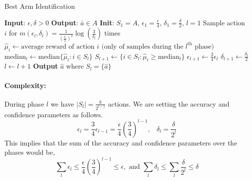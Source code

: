 










\begin{algorithm}
\caption{Best Arm Identification}
\begin{algorithmic}[1]
\State \textbf{Input}: $\epsilon, \delta > 0$
\State \textbf{Output}: $\bar{a} \in A$
\State \textbf{Init}: $S_{1} = A$, $\epsilon_{1} = \frac{\epsilon}{4}$, $\delta_{1} = \frac{\delta}{2}$, $l = 1$
\Repeat
        \State Sample action $i$ for $m(\epsilon_l, \delta_l) = \frac{1}{\left(\frac{\epsilon_{l}}{2}\right)^2} \log \left(\frac{3}{\delta_{l}}\right)$ times
        \State $\hat{\mu}_{i} \leftarrow \text{average reward of action } i \text{ (only of samples during the } l^{\text{th}} \text{ phase)}$
    \EndFor
    \State $\text{median}_{l} \leftarrow \text{median} \{ \hat{\mu}_{i} : i \in S_{l} \}$
    \State $S_{l+1} \leftarrow \{ i \in S_{l} : \hat{\mu}_{i} \geq \text{median}_{l} \}$
    \State $\epsilon_{l+1} \leftarrow \frac{3}{4} \epsilon_{l}$
    \State $\delta_{l+1} \leftarrow \frac{\delta_{l}}{2}$
    \State $l \leftarrow l + 1$
\State \textbf{Output} $\hat{a}$ where $S_l = \{\hat{a}\}$
\end{algorithmic}
\end{algorithm}

\paragraph{Complexity:}

During phase $l$ we have $\left|S_{l}\right|=\frac{k}{2^{l-1}}$
actions. We are setting the accuracy and confidence parameters as follows.
\[
\epsilon_{l}=\frac{3}{4}\epsilon_{l-1}=\frac{\epsilon}{4}\left(\frac{3}{4}\right)^{l-1},\;\;\;\delta_{l}=\frac{\delta}{2^{l}}
\]
This implies that the sum of the accuracy and confidence parameters over the phases would be,
\[
 \sum_l\epsilon_{l}\le\frac{\epsilon}{4}\left(\frac{3}{4}\right)^{l-1}\le \epsilon, \text{ and } \sum_l\delta_{l}\le\sum_l \frac{\delta}{2^{l}} \le\delta
\]

